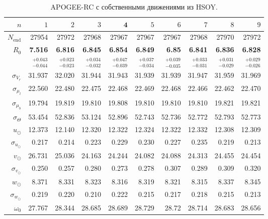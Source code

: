 \documentclass{matmex-diploma-custom}
\begin{document}
\begin{table}[h!]
\centering
\caption{APOGEE-RC с собственными движениями из HSOY.}
\begin{tabular}{r|rrrr|r|rrrr}
\hline
$n$ & $1$ & $2$ & $3$ & $\textbf{4}$ & $5$&$ 6 $&$ 7 $&$ 8 $&$ 9 $\\\hline
 $N_{\mathrm{end}}$ & 27954       &    27972 &    27968 &    27967 &   27967 &    27967 &    27968 &    27970 &    27972 \\
 $R_0 $&  \textbf{7.516}       &    \textbf{6.816} &    \textbf{6.845} &    \textbf{6.854} &   \textbf{6.849} &     \textbf{6.85} &    \textbf{6.841} &    \textbf{6.836} &    \textbf{6.828} \\
       & $_{-0.044}^{+0.043} $ & $_{-0.023}^{+0.023}$ & $_{-0.032}^{+0.034}$   & $_{-0.039}^{+0.047}$  & $_{-0.034}^{+0.037}$  & $_{-0.035}^{+0.039}$  & $_{-0.031}^{+0.033}$  & $_{-0.029}^{+0.031}$  & $_{-0.026}^{+0.029}$  \\\hline
 $\sigma_{V_r} $& 31.937      &  32.020 &  31.944 &  31.943 &  31.939 &  31.939 &  31.947 &  31.959 &  31.969  \\ 
 $\sigma_{\mu_l} $& 22.560      &  22.480 &  22.475 &  22.468 &  22.469 &  22.468 &  22.466 &  22.462 &  22.470  \\
 $\sigma_{\mu_b} $& 19.794      &  19.819 &  19.810 &  19.808 &  19.810 &  19.810 &  19.810 &  19.821 &  19.821  \\\hline 
 $\sigma_{\Theta} $& 53.454      &  52.836 &  53.124 &  52.896 &  52.743 &  52.736 &  52.772 &  52.793 &  52.773  \\\hline 
 $ u_{\odot} $& 12.373      &    12.140 &    12.320 &   12.322 &  12.324 &   12.322 &   12.332 &   12.308 &   12.309 \\
 $\sigma_{u_{\odot}} $&0.217       &    0.214 &    0.223 &    0.229 &    0.230 &    0.227 &    0.235 &    0.219 &    0.213 \\
 $v_{\odot} $& 26.731      &   25.036 &   24.163 &   24.244 &  24.082 &   24.088 &   24.313 &   24.455 &   24.454 \\
 $\sigma_{v_{\odot}}$&0.250       &    0.257 &     0.280 &    0.273 &   0.278 &    0.307 &    0.289 &    0.309 &     0.320 \\
 $w_{\odot} $& 8.371       &    8.331 &    8.323 &    8.316 &   8.319 &    8.321 &    8.315 &    8.337 &    8.345 \\
 $\sigma_{w_{\odot}}$&0.219       &     0.220 &     0.210 &    0.222 &   0.215 &    0.217 &    0.218 &    0.215 &    0.213 \\
 $\omega_0 $&27.767      &   28.344 &   28.685 &   28.689 &  28.729 &    28.72 &   28.714 &   28.683 &   28.656 \\

\end{tabular}
\end{table}
\end{document}
